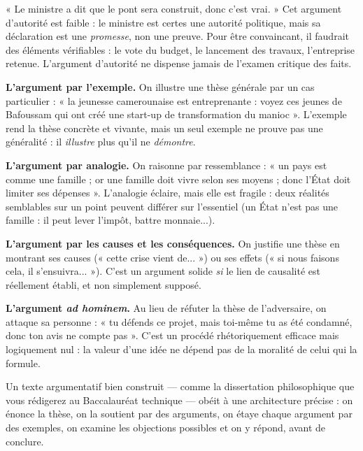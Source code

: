 \documentclass[11pt]{article}
\newcounter{popsec}
\newcounter{popsub}
\newcommand{\courssub}[1]{%
  \stepcounter{popsub}%
  \par\vspace{9pt}\noindent{\popxbold\fontsize{11.5}{13}\selectfont\color{popink}{\color{poporange}\thepopsec.\thepopsub}\hspace{6pt}#1}\par\nopagebreak\vspace{4pt}
}
\begin{document}
\begin{exemplebox}
« Le ministre a dit que le pont sera construit, donc c'est vrai. » Cet argument d'autorité est faible : le ministre est certes une autorité politique, mais sa déclaration est une \emph{promesse}, non une preuve. Pour être convaincant, il faudrait des éléments vérifiables : le vote du budget, le lancement des travaux, l'entreprise retenue. L'argument d'autorité ne dispense jamais de l'examen critique des faits.
\end{exemplebox}

\textbf{L'argument par l'exemple.} On illustre une thèse générale par un cas particulier : « la jeunesse camerounaise est entreprenante : voyez ces jeunes de Bafoussam qui ont créé une start-up de transformation du manioc ». L'exemple rend la thèse concrète et vivante, mais un seul exemple ne prouve pas une généralité : il \emph{illustre} plus qu'il ne \emph{démontre}.

\textbf{L'argument par analogie.} On raisonne par ressemblance : « un pays est comme une famille ; or une famille doit vivre selon ses moyens ; donc l'État doit limiter ses dépenses ». L'analogie éclaire, mais elle est fragile : deux réalités semblables sur un point peuvent différer sur l'essentiel (un État n'est pas une famille : il peut lever l'impôt, battre monnaie...).

\textbf{L'argument par les causes et les conséquences.} On justifie une thèse en montrant ses causes (« cette crise vient de... ») ou ses effets (« si nous faisons cela, il s'ensuivra... »). C'est un argument solide \emph{si} le lien de causalité est réellement établi, et non simplement supposé.

\textbf{L'argument \emph{ad hominem}.} Au lieu de réfuter la thèse de l'adversaire, on attaque sa personne : « tu défends ce projet, mais toi-même tu as été condamné, donc ton avis ne compte pas ». C'est un procédé rhétoriquement efficace mais logiquement nul : la valeur d'une idée ne dépend pas de la moralité de celui qui la formule.

\courssub{La structure d'un texte argumentatif}

Un texte argumentatif bien construit — comme la dissertation philosophique que vous rédigerez au Baccalauréat technique — obéit à une architecture précise : on énonce la thèse, on la soutient par des arguments, on étaye chaque argument par des exemples, on examine les objections possibles et on y répond, avant de conclure.
\end{document}
